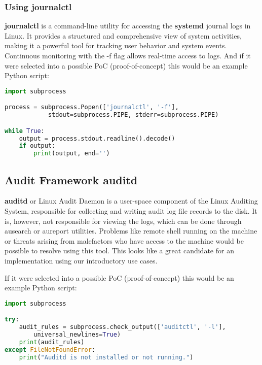 \documentclass{VUMIFPSmagistrinis}
\begin{document}
\subsubsection{Using journalctl}
\textbf{journalctl} is a command-line utility for accessing the \textbf{systemd} journal logs in Linux. It provides a structured and comprehensive view of system activities, making it a powerful tool for tracking user behavior and system events. Continuous monitoring with the -f flag allows real-time access to logs. And if it were selected into a possible PoC (proof-of-concept) this would be an example Python script:
\begin{lstlisting}[language=Python]
import subprocess

process = subprocess.Popen(['journalctl', '-f'], 
            stdout=subprocess.PIPE, stderr=subprocess.PIPE)

while True:
    output = process.stdout.readline().decode()
    if output:
        print(output, end='')
\end{lstlisting}

\subsection{Audit Framework auditd}
\textbf{auditd} or Linux Audit Daemon is a user-space component of the Linux Auditing System, responsible for collecting and writing audit log file records to the disk. It is, however, not responsible for viewing the logs, which can be done through ausearch or aureport utilities. Problems like remote shell running on the machine or threats arising from malefactors who have access to the machine would be possible to resolve using this tool. This looks like a great candidate for an implementation using our introductory use cases.

If it were selected into a possible PoC (proof-of-concept) this would be an example Python script:
\begin{lstlisting}[language=Python]
import subprocess

try:
    audit_rules = subprocess.check_output(['auditctl', '-l'], 
        universal_newlines=True)
    print(audit_rules)
except FileNotFoundError:
    print("Auditd is not installed or not running.")
\end{lstlisting}
\end{document}
